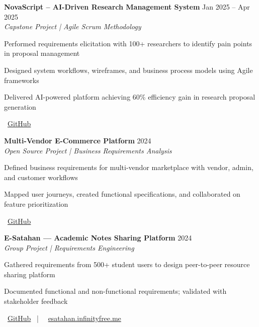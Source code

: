 \documentclass[letterpaper,10pt]{article}
\newenvironment{resume_list}{
  \vspace{-2pt}
  \begin{itemize}[itemsep=1pt, leftmargin=14pt]
}{
  \end{itemize}\vspace{-3pt}
}
\begin{document}
\textbf{NovaScript – AI-Driven Research Management System} \hfill Jan 2025 – Apr 2025\\
\textit{Capstone Project | Agile Scrum Methodology}\\
\begin{resume_list}
  \item Performed requirements elicitation with 100+ researchers to identify pain points in proposal management
  \item Designed system workflows, wireframes, and business process models using Agile frameworks
  \item Delivered AI-powered platform achieving 60\% efficiency gain in research proposal generation
  \item \faGithub~\href{https://github.com/Chandima0406/NovaScript.git}{GitHub}
\end{resume_list}


\textbf{Multi-Vendor E-Commerce Platform} \hfill 2024\\
\textit{Open Source Project | Business Requirements Analysis}\\
\begin{resume_list}
  \item Defined business requirements for multi-vendor marketplace with vendor, admin, and customer workflows
  \item Mapped user journeys, created functional specifications, and collaborated on feature prioritization
  \item \faGithub~\href{https://github.com/vindyakodithuwakku02/gocart.git}{GitHub}
\end{resume_list}

\vspace{5mm} %

\textbf{E-Satahan — Academic Notes Sharing Platform} \hfill 2024\\
\textit{Group Project | Requirements Engineering}\\
\begin{resume_list}
  \item Gathered requirements from 500+ student users to design peer-to-peer resource sharing platform
  \item Documented functional and non-functional requirements; validated with stakeholder feedback
  \item \faGithub~\href{https://github.com/Chandima0406/E-Satahan.git}{GitHub} ~|~ \faGlobe~\href{https://esatahan.infinityfree.me}{esatahan.infinityfree.me}
\end{resume_list}
\end{document}
